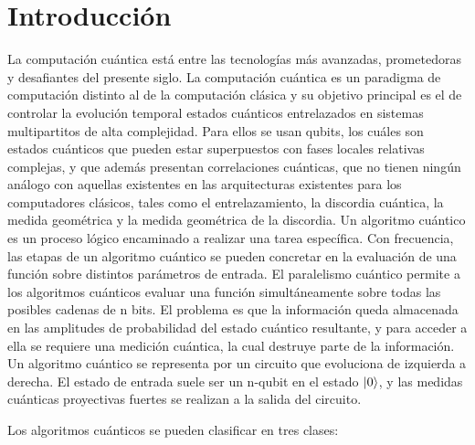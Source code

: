 \chapter{Introducci\'on}

La computación cuántica \cite{Hayashi_2015, Jones_2009, Nielsen_2009, Nakahara_2008} está entre las tecnologías más avanzadas, prometedoras y desafiantes del presente siglo. La computación cuántica es un paradigma de computación distinto al de la computación clásica y su objetivo principal es el de controlar la evolución temporal estados cuánticos entrelazados en sistemas multipartitos de alta complejidad. Para ellos se usan qubits, los cuáles son estados cuánticos que pueden estar superpuestos con fases locales relativas complejas, y que además presentan correlaciones cuánticas, que no tienen ningún análogo con aquellas existentes en las arquitecturas existentes para los computadores clásicos, tales como el entrelazamiento, la discordia cuántica, la medida geométrica y la medida geométrica de la discordia.  Un algoritmo cuántico es un proceso lógico encaminado a realizar una tarea específica. Con frecuencia, las etapas de un algoritmo cuántico se pueden concretar en la evaluación de una función sobre distintos parámetros de entrada. El paralelismo cuántico permite a los algoritmos cuánticos evaluar una función simultáneamente sobre todas las posibles cadenas de n bits. El problema es que la información queda almacenada en las amplitudes de probabilidad del estado cuántico resultante, y para acceder a ella se requiere una medición cuántica, la cual destruye parte de la información. Un algoritmo cuántico se representa por un circuito que evoluciona de izquierda a derecha. El estado de entrada suele ser un n-qubit en el estado $\ket{0}$, y las medidas cuánticas proyectivas fuertes se realizan a la salida del circuito.

Los algoritmos cuánticos se pueden clasificar en tres clases:

